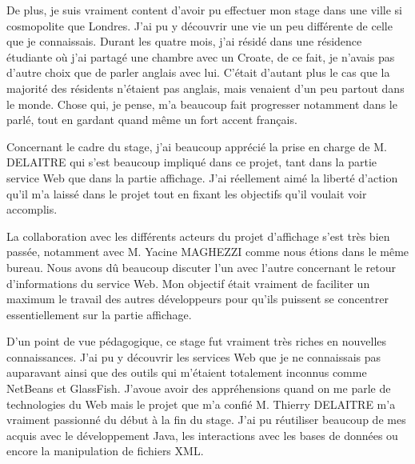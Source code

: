 De plus, je suis vraiment content d'avoir pu effectuer mon stage dans une ville si cosmopolite que Londres.
J'ai pu y d\'ecouvrir une vie un peu diff\'erente de celle que je connaissais.
Durant les quatre mois, j'ai r\'esid\'e dans une r\'esidence \'etudiante o\`u j'ai partag\'e une chambre avec un Croate, de ce fait, je n'avais pas d'autre choix que de parler anglais avec lui.
C'\'etait d'autant plus le cas que la majorit\'e des r\'esidents n'\'etaient pas anglais, mais venaient d'un peu partout dans le monde.
Chose qui, je pense, m'a beaucoup fait progresser notamment dans le parl\'e, tout en gardant quand m\^eme un fort accent fran\c{c}ais.

Concernant le cadre du stage, j'ai beaucoup appr\'eci\'e la prise en charge de M. DELAITRE qui s'est beaucoup impliqu\'e dans ce projet, tant dans la partie service Web que dans la partie affichage.
J'ai r\'eellement aim\'e la libert\'e d'action qu'il m'a laiss\'e dans le projet tout en fixant les objectifs qu'il voulait voir accomplis.

La collaboration avec les diff\'erents acteurs du projet d'affichage s'est tr\`es bien pass\'ee, notamment avec M. Yacine MAGHEZZI comme nous \'etions dans le m\^eme bureau.
Nous avons d\^u beaucoup discuter l'un avec l'autre concernant le retour d'informations du service Web.
Mon objectif \'etait vraiment de faciliter un maximum le travail des autres d\'eveloppeurs pour qu'ils puissent se concentrer essentiellement sur la partie affichage.

D'un point de vue p\'edagogique, ce stage fut vraiment tr\`es riches en nouvelles connaissances.
J'ai pu y d\'ecouvrir les services Web que je ne connaissais pas auparavant ainsi que des outils qui m'\'etaient totalement inconnus comme NetBeans et GlassFish.
J'avoue avoir des appr\'ehensions quand on me parle de technologies du Web mais le projet que m'a confi\'e M. Thierry DELAITRE m'a vraiment passionn\'e du d\'ebut \`a la fin du stage.
J'ai pu r\'eutiliser beaucoup de mes acquis avec le d\'eveloppement Java, les interactions avec les bases de donn\'ees ou encore la manipulation de fichiers XML.



\clearpage
